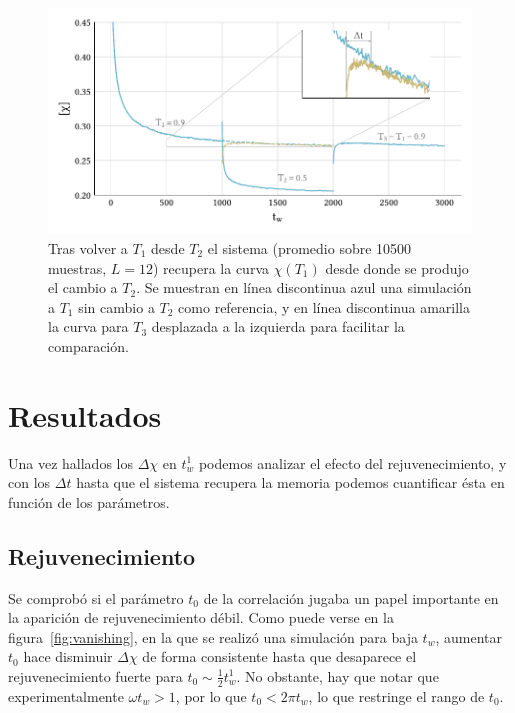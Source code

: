 \documentclass[11pt]{report}
\begin{document}
\begin{figure}
  \centering
  \includegraphics{../study_cases/memory_toy/memorytoy_handedit.pdf}
  \caption{Tras volver a $T_1$ desde $T_2$ el sistema (promedio sobre
    10500 muestras, $L=12$) recupera la curva $χ(T_1)$ desde donde se
    produjo el cambio a $T_2$. Se muestran en línea discontinua azul
    una simulación a $T_1$ sin cambio a $T_2$ como referencia, y en
    línea discontinua amarilla la curva para $T_3$ desplazada a la
    izquierda para facilitar la comparación.}
  \label{fig:memorytoy}
\end{figure}

\chapter{Resultados}
Una vez hallados los $Δχ$ en $t_w^1$ podemos analizar el efecto del
rejuvenecimiento, y con los $Δt$ hasta que el sistema recupera la
memoria podemos cuantificar ésta en función de los parámetros.

\section{Rejuvenecimiento}
Se comprobó si el parámetro $t_0$ de la correlación jugaba un papel
importante en la aparición de rejuvenecimiento débil. Como puede verse
en la figura~\ref{fig:vanishing}, en la que se realizó una simulación
para baja $t_w$, aumentar $t_0$ hace disminuir $Δχ$ de forma consistente
hasta que desaparece el rejuvenecimiento fuerte para
$t_0∼\frac{1}{2}t_w^1$. No obstante, hay que notar que experimentalmente
$ωt_w >1$, por lo que $t_0 < 2πt_w $, lo que restringe el rango de
$t_0$.
\end{document}
